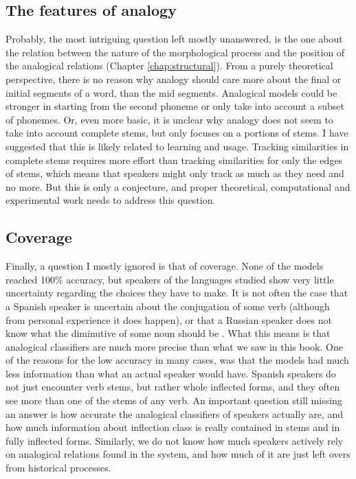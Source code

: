 \subsection{The features of analogy}

Probably, the most intriguing question left mostly unanswered, is the one about the relation between the nature of the morphological process and the position of the analogical relations (Chapter \ref{chap:structural}).
From a purely theoretical perspective, there is no reason why analogy should care more about the final or initial segments of a word, than the mid segments.
Analogical models could be stronger in starting from the second phoneme or only take into account a subset of phonemes.
Or, even more basic, it is unclear why analogy does not seem to take into account complete stems, but only focuses on a portions of stems.
I have suggested that this is likely related to learning and usage.
Tracking similarities in complete stems requires more effort than tracking similarities for only the edges of stems, which means that speakers might only track as much as they need and no more.
But this is only a conjecture, and proper theoretical, computational and experimental work needs to address this question.

\subsection{Coverage}

Finally, a question I mostly ignored is that of coverage.
None of the models reached 100\% accuracy, but speakers of the languages studied show very little uncertainty regarding the choices they have to make.
It is not often the case that a Spanish speaker is uncertain about the conjugation of some verb (although from personal experience it does happen), or that a Russian speaker does not know what the diminutive of some noun should be \autocite{Gouskova.2015}.
What this means is that analogical classifiers are much more precise than what we saw in this book.
One of the reasons for the low accuracy in many cases, was that the models had much less information than what an actual speaker would have.
Spanish speakers do not just encounter verb stems, but rather whole inflected forms, and they often see more than one of the stems of any verb.
An important question still missing an answer is how accurate the analogical classifiers of speakers actually are, and how much information about inflection class is really contained in stems and in fully inflected forms.
Similarly, we do not know how much speakers actively rely on analogical relations found in the system, and how much of it are just left overs from historical processes.

